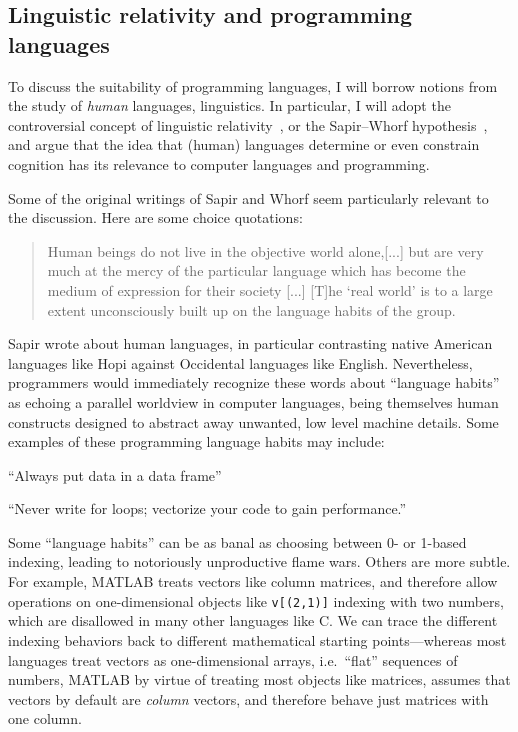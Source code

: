 \documentclass[11pt]{asaproc}
\begin{document}
\subsection{Linguistic relativity and programming languages}

To discuss the suitability of programming languages, I will borrow notions from
the study of \textit{human} languages, linguistics. In particular, I will adopt
the controversial concept of linguistic relativity~\cite{Gumperz1996}, or the
Sapir--Whorf hypothesis~\cite{Brown1976}, and argue that the idea that (human)
languages determine or even constrain cognition has its relevance to computer
languages and programming.

Some of the original writings of Sapir and Whorf seem particularly relevant to
the discussion. Here are some choice quotations:

\begin{quotation}
Human beings do not live in the objective world alone,[...] but are very much
at the mercy of the particular language which has become the medium of
expression for their society [...] [T]he `real world' is to a large extent
unconsciously built up on the language habits of the group.~\cite{Sapir1929}
\end{quotation}

Sapir wrote about human languages, in particular contrasting native American
languages like Hopi against Occidental languages like English. Nevertheless,
programmers would immediately recognize these words about ``language habits''
as echoing a parallel worldview in computer languages, being themselves human
constructs designed to abstract away unwanted, low level machine details.
Some examples of these programming language habits may include:

``Always put data in a data frame''

``Never write for loops; vectorize your code to gain performance.''

Some ``language habits'' can be as banal as choosing between 0- or 1-based
indexing, leading to notoriously unproductive flame wars.  Others are more
subtle. For example, MATLAB treats vectors like column matrices, and therefore
allow operations on one-dimensional objects like \lstinline|v[(2,1)]| indexing
with two numbers, which are disallowed in many other languages like C. We can
trace the different indexing behaviors back to different mathematical starting
points---whereas most languages treat vectors as one-dimensional arrays, i.e.\
``flat'' sequences of numbers, MATLAB by virtue of treating most objects like
matrices, assumes that vectors by default are \textit{column} vectors, and
therefore behave just matrices with one column.
\end{document}
